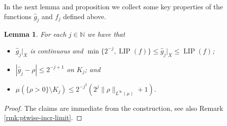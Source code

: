 \documentclass{amsart}
\newtheorem{lemma}[theorem]{Lemma}
\numberwithin{equation}{section}
\newcommand{\N}{\mathbb{N}}
\newcommand{\LIP}{\operatorname{LIP}}
\begin{document}
In the next lemma and proposition we collect some key properties of the functions $\hat g_j$ and $f_j$ defined above.

\begin{lemma}\label{lem:rho-jm}
For each $j\in\N$ we have that 
\begin{itemize}
	\item[(a)] $\hat g_j|_X$ is continuous and $\min\{2^{-j},\LIP(f)\}\le \hat g_j|_X\le\LIP(f)$;
	\item[(b)] $|\hat g_j-\rho|\le 2^{-j+1}$ on $K_j$; and 
	\item[(c)] $\mu(\{\rho>0\}\setminus K_j)\le 2^{-j^2}(2^j\|\rho\|_{L^\infty(\mu)}+1)$.
\end{itemize}
\end{lemma}
\begin{proof}
The claims are immediate from the construction, see also Remark \ref{rmk:ptwise-incr-limit}.
\end{proof}
\end{document}
